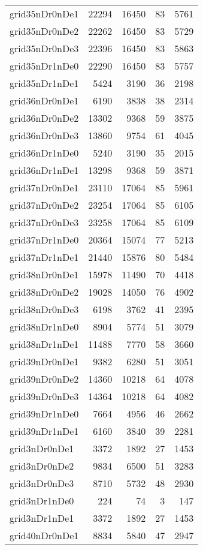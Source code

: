 \begin{longtable}{lrrrr}
grid35nDr0nDe1 & 22294 & 16450 & 83 & 5761 \\
grid35nDr0nDe2 & 22262 & 16450 & 83 & 5729 \\
grid35nDr0nDe3 & 22396 & 16450 & 83 & 5863 \\
grid35nDr1nDe0 & 22290 & 16450 & 83 & 5757 \\
grid35nDr1nDe1 & 5424 & 3190 & 36 & 2198 \\
grid36nDr0nDe1 & 6190 & 3838 & 38 & 2314 \\
grid36nDr0nDe2 & 13302 & 9368 & 59 & 3875 \\
grid36nDr0nDe3 & 13860 & 9754 & 61 & 4045 \\
grid36nDr1nDe0 & 5240 & 3190 & 35 & 2015 \\
grid36nDr1nDe1 & 13298 & 9368 & 59 & 3871 \\
grid37nDr0nDe1 & 23110 & 17064 & 85 & 5961 \\
grid37nDr0nDe2 & 23254 & 17064 & 85 & 6105 \\
grid37nDr0nDe3 & 23258 & 17064 & 85 & 6109 \\
grid37nDr1nDe0 & 20364 & 15074 & 77 & 5213 \\
grid37nDr1nDe1 & 21440 & 15876 & 80 & 5484 \\
grid38nDr0nDe1 & 15978 & 11490 & 70 & 4418 \\
grid38nDr0nDe2 & 19028 & 14050 & 76 & 4902 \\
grid38nDr0nDe3 & 6198 & 3762 & 41 & 2395 \\
grid38nDr1nDe0 & 8904 & 5774 & 51 & 3079 \\
grid38nDr1nDe1 & 11488 & 7770 & 58 & 3660 \\
grid39nDr0nDe1 & 9382 & 6280 & 51 & 3051 \\
grid39nDr0nDe2 & 14360 & 10218 & 64 & 4078 \\
grid39nDr0nDe3 & 14364 & 10218 & 64 & 4082 \\
grid39nDr1nDe0 & 7664 & 4956 & 46 & 2662 \\
grid39nDr1nDe1 & 6160 & 3840 & 39 & 2281 \\
grid3nDr0nDe1 & 3372 & 1892 & 27 & 1453 \\
grid3nDr0nDe2 & 9834 & 6500 & 51 & 3283 \\
grid3nDr0nDe3 & 8710 & 5732 & 48 & 2930 \\
grid3nDr1nDe0 & 224 & 74 & 3 & 147 \\
grid3nDr1nDe1 & 3372 & 1892 & 27 & 1453 \\
grid40nDr0nDe1 & 8834 & 5840 & 47 & 2947 \\

\end{longtable}
